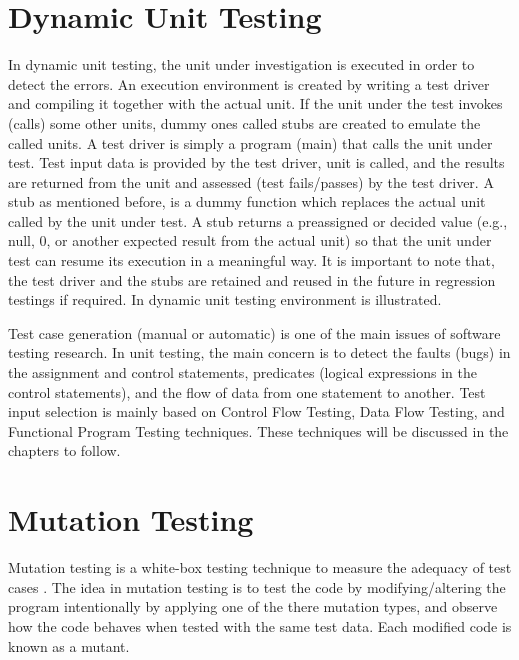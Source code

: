 \section{Dynamic Unit Testing}
In dynamic unit testing, the unit under investigation is executed in order to detect the errors. An execution environment is created by writing a test driver and compiling it together with the actual unit. If the unit under the test invokes (calls) some other units, dummy ones called stubs are created to emulate the called units. A test driver is simply a program (main) that calls the unit under test. Test input data is provided by the test driver, unit is called, and the results are returned from the unit and assessed (test fails/passes) by the test driver.  A stub as mentioned before, is a dummy function which replaces the actual unit called by the unit under test. A stub returns a preassigned or decided value (e.g., null, 0, or another expected result from the actual unit) so that the unit under test can resume its execution in a meaningful way. It is important to note that, the test driver and the stubs are retained and reused in the future in regression testings if required. In  dynamic unit testing environment is illustrated.

Test case generation (manual or automatic) is one of the main issues of software testing research. In unit testing, the main concern is to detect the faults (bugs) in the assignment and control statements, predicates (logical expressions in the control statements), and the flow of data from one statement to another. Test input selection is mainly based on Control Flow Testing, Data Flow Testing, and Functional Program Testing techniques. These techniques will be discussed in the chapters to follow. 

\section{Mutation Testing}
Mutation testing is a white-box testing technique to measure the adequacy of test cases \autocite{demillo1978hints}. The idea in mutation testing is to test the code by modifying/altering the program intentionally by applying one of the there mutation types, and observe how the code behaves when tested with the same test data.  Each modified code is known as a mutant.

